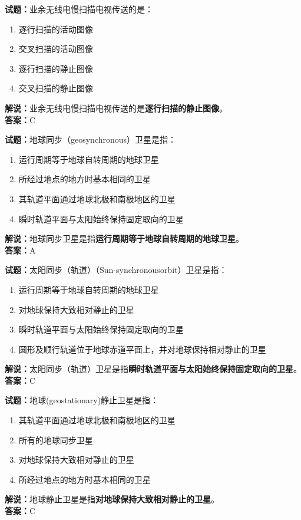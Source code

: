 \documentclass{ctexbook}
\begin{document}
\bigskip


\noindent\textbf{试题：}业余无线电慢扫描电视传送的是：
\begin{enumerate}[leftmargin=3em]
\item 逐行扫描的活动图像
\item 交叉扫描的活动图像
\item 逐行扫描的静止图像
\item 交叉扫描的静止图像
\end{enumerate}
\noindent\textbf{解说：}业余无线电慢扫描电视传送的是\textbf{逐行扫描的静止图像}。\\\noindent\textbf{答案：}C



\bigskip


\noindent\textbf{试题：}地球同步（geosynchronous）卫星是指：
\begin{enumerate}[leftmargin=3em]
\item 运行周期等于地球自转周期的地球卫星
\item 所经过地点的地方时基本相同的卫星
\item 其轨道平面通过地球北极和南极地区的卫星
\item 瞬时轨道平面与太阳始终保持固定取向的卫星
\end{enumerate}
\noindent\textbf{解说：}地球同步卫星是指\textbf{运行周期等于地球自转周期的地球卫星}。\\\noindent\textbf{答案：}A




\bigskip


\noindent\textbf{试题：}太阳同步（轨道）（Sun-synchronousorbit）卫星是指：
\begin{enumerate}[leftmargin=3em]
\item 运行周期等于地球自转周期的地球卫星
\item 对地球保持大致相对静止的卫星
\item 瞬时轨道平面与太阳始终保持固定取向的卫星
\item 圆形及顺行轨道位于地球赤道平面上，并对地球保持相对静止的卫星
\end{enumerate}
\noindent\textbf{解说：}太阳同步（轨道）卫星是指\textbf{瞬时轨道平面与太阳始终保持固定取向的卫星}。\\\noindent\textbf{答案：}C



\bigskip


\noindent\textbf{试题：}地球(geostationary)静止卫星是指：
\begin{enumerate}[leftmargin=3em]
\item 其轨道平面通过地球北极和南极地区的卫星
\item 所有的地球同步卫星
\item 对地球保持大致相对静止的卫星
\item 所经过地点的地方时基本相同的卫星
\end{enumerate}
\noindent\textbf{解说：}地球静止卫星是指\textbf{对地球保持大致相对静止的卫星}。\\\noindent\textbf{答案：}C
\end{document}
